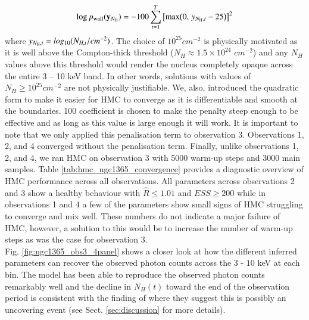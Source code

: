 \documentclass{aa}
\begin{document}
\begin{equation}
\log p_{\rm wall}(\mathbf{y}_{N_{\rm H}}) = -100 \sum_{t=1}^{T} \left[\max\!\left(0,\, y_{N_{\rm H},t} - 25\right)\right]^2
\label{eq:hmc_penalisation}
\end{equation}
where $y_{N_{\rm H},t} = log_{10}({N_{H,t}}/cm^{-2})$. The choice of $10^{25}cm^{-2}$ is physically motivated as it is well above the Compton-thick threshold ($N_H \approx 1.5 \times 10^{24}$ $cm^{-2}$) and any $N_H$ values above this threshold would render the nucleus completely opaque across the entire 3 – 10 keV band. In other words, solutions with values of $N_H \ge 10^{25}cm^{-2}$ are not physically justifiable. We, also, introduced the quadratic form to make it easier for HMC to converge as it is differentiable and smooth at the boundaries. 100 coefficient is chosen to make the penalty steep enough to be effective and as long as this value is large enough it will work. It is important to note that we only applied this penalisation term to observation 3. Observations 1, 2, and 4 converged without the penalisation term. Finally, unlike observations 1, 2, and 4, we ran HMC on observation 3 with 5000 warm-up steps and 3000 main samples. Table \ref{tab:hmc_ngc1365_convergence} provides a diagnostic overview of HMC performance across all observations. All parameters across observations 2 and 3 show a healthy behaviour with $\hat{R} \le 1.01$ and $ESS \ge 200$ while in observations 1 and 4 a few of the parameters show small signs of HMC struggling to converge and mix well. These numbers do not indicate a major failure of HMC, however, a solution to this would be to increase the number of warm-up steps as was the case for observation 3. \\
Fig. \ref{fig:ngc1365_obs3_4panel} shows a closer look at how the different inferred parameters can recover the observed photon counts across the $3$ - $10$ keV at each bin. The model has been able to reproduce the observed photon counts remarkably well and the decline in $N_H(t)$ toward the end of the observation period is consistent with the finding of \citet{Braito2014} where they suggest this is possibly an uncovering event (see Sect. \ref{sec:discussion} for more details). \\
\end{document}
